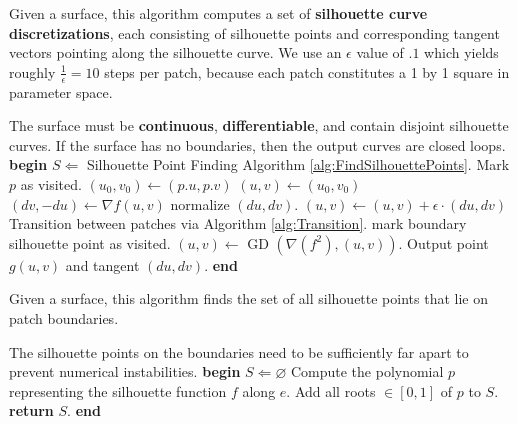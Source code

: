 \documentclass[12pt, letterpaper]{article}
\let\emptyset\varnothing
\begin{document}
			\begin{algorithm}                      %
			\caption{Given a surface, this algorithm computes a set of \textbf{silhouette curve discretizations},
				each consisting of silhouette points and corresponding tangent vectors pointing along the silhouette curve.
				We use an $\epsilon$ value of $.1$ which yields roughly $\frac{1}{\epsilon} = 10$ steps per patch, because each patch constitutes a 1 by 1 square in parameter space.} %
			\label{alg:TraceSilhouettes}       %
			\begin{algorithmic}                    %
			    \REQUIRE The surface must be \textbf{continuous}, \textbf{differentiable}, and contain disjoint silhouette curves.
			    \ENSURE  If the surface has no boundaries, then the output curves are closed loops.
				\STATE \textbf{begin}
			    \STATE $S \Leftarrow $ Silhouette Point Finding Algorithm \ref{alg:FindSilhouettePoints}.
				\STATE Mark $p$ as visited.
			        \STATE $(u_{0}, v_{0}) \leftarrow (p.u, p.v)$
				\STATE $(u, v) \leftarrow (u_{0}, v_{0})$
				\REPEAT
				        \STATE $(dv, -du) \leftarrow \nabla f(u,v)$
					\STATE normalize $(du, dv)$.
					\STATE $(u, v) \leftarrow (u, v) + \epsilon \cdot (du, dv)$
						\STATE Transition between patches via Algorithm \ref{alg:Transition}.
						\STATE mark boundary silhouette point as visited.
					\ENDIF
					\STATE $(u, v) \leftarrow $ GD $(\nabla(f^{2}),(u,v))$.
					\STATE Output point $g(u, v)$ and tangent $(du, dv)$.
			   \ENDFOR
				\STATE \textbf{end}
			\end{algorithmic}
			\end{algorithm}

			\begin{algorithm}                      %
			\caption{Given a surface, this algorithm finds the set of all silhouette points that lie on patch boundaries.} %
			\label{alg:FindSilhouettePoints}  %
			\begin{algorithmic}                    %
			 	\REQUIRE The silhouette points on the boundaries need to be sufficiently far apart to prevent numerical instabilities.
				\ENSURE  
				\STATE \textbf{begin}
				\STATE $S \Leftarrow \emptyset$
					\STATE Compute the polynomial $p$ representing the silhouette function $f$ along $e$.
					\STATE Add all roots $\in [0, 1]$ of $p$ to $S$.
				\ENDFOR
			 	\STATE \textbf{return} $S$.
				\STATE \textbf{end}
			\end{algorithmic}
			\end{algorithm}
\end{document}
